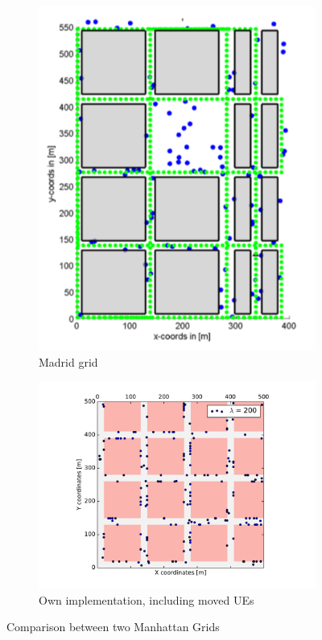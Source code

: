 \begin{figure}
\centering
\begin{subfigure}{.35\textwidth}
  \centering
  \includegraphics[width=1.2\linewidth]{figures/Madrid}
  \caption{Madrid grid \cite{Raschkowski}}
  \label{fig:sub1}
\end{subfigure}%
\begin{subfigure}{.65\textwidth}
  \centering
  \includegraphics[width=1.058\linewidth]{figures/mh_grid}
  \caption{Own implementation, including moved UEs}
  \label{fig:sub2}
\end{subfigure}
\caption{Comparison between two Manhattan Grids}
\label{fig:test}
\end{figure}


